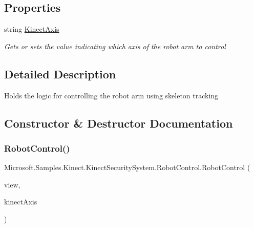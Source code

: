 \subsection*{Properties}
\begin{DoxyCompactItemize}
\item 
string \hyperlink{class_microsoft_1_1_samples_1_1_kinect_1_1_kinect_security_system_1_1_robot_control_a14489e9305524cc1a7e22e2d5fd022e5}{Kinect\+Axis}
\begin{DoxyCompactList}\small\item\em Gets or sets the value indicating which axis of the robot arm to control \end{DoxyCompactList}\end{DoxyCompactItemize}


\subsection{Detailed Description}
Holds the logic for controlling the robot arm using skeleton tracking 

\subsection{Constructor \& Destructor Documentation}
\mbox{\label{class_microsoft_1_1_samples_1_1_kinect_1_1_kinect_security_system_1_1_robot_control_acd1a271344cf99d83ddf38f50b49fdb9}} 
\subsubsection{\texorpdfstring{Robot\+Control()}{RobotControl()}}
{\footnotesize\ttfamily Microsoft.\+Samples.\+Kinect.\+Kinect\+Security\+System.\+Robot\+Control.\+Robot\+Control (\begin{DoxyParamCaption}\item[{\hyperlink{class_microsoft_1_1_samples_1_1_kinect_1_1_kinect_security_system_1_1_gesture_result_view}{Gesture\+Result\+View}}]{view,  }\item[{string}]{kinect\+Axis }\end{DoxyParamCaption})}



